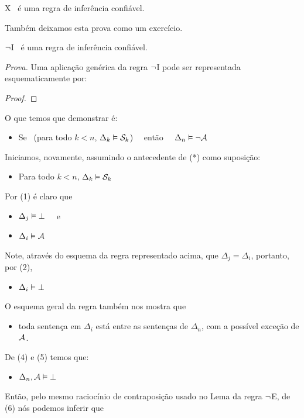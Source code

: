 \begin{factoidboxe}
	X \ é uma regra de inferência confiável.
\end{factoidboxe}

Também deixamos esta prova como um exercício.

\begin{factoidboxe}
	$\neg$I \ é uma regra de inferência confiável.
\end{factoidboxe}
\noindent\emph{Prova.}
	Uma aplicação genérica da regra $\neg$I pode ser representada esquematicamente por:
\begin{proof}
   \open
   \close
\end{proof}\noindent
O que temos que demonstrar é:
\begin{itemize}
	\item[(*)]  Se  \ ({para todo}  $k<n$, $\Delta_k \vDash \mathcal{S}_k$) \ \ então \ \ $\Delta_n \vDash \neg\mathcal{A}$
\end{itemize}
Iniciamos, novamente, assumindo o antecedente de (*) como suposição:
\begin{itemize}
	\item[(1)] Para todo  $k<n$, $\Delta_k \vDash \mathcal{S}_k$
\end{itemize}
Por (1) é claro que
\begin{itemize}
	\item[(2)] $\Delta_j \vDash \bot$ \ \ e
\end{itemize}
\begin{itemize}
	\item[(3)] $\Delta_i \vDash \mathcal{A}$
\end{itemize}
Note, através do esquema da regra representado acima, que $\Delta_j=\Delta_i$, portanto, por (2),
\begin{itemize}
	\item[(4)] $\Delta_i \vDash \bot$
\end{itemize}
O esquema geral da regra também nos mostra que
\begin{itemize}
 	\item[(5)] toda sentença em $\Delta_i$ está entre as sentenças de $\Delta_n$, com a possível exceção de $\mathcal{A}$.
\end{itemize}
De (4) e (5) temos que:
\begin{itemize}
	\item[(6)] $\Delta_n, \mathcal{A} \vDash \bot$
\end{itemize}
Então, pelo mesmo raciocínio de contraposição usado no Lema da regra $\neg$E, de (6) nós podemos inferir que
